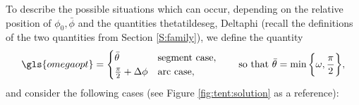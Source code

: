 \documentclass[reqno]{amsart}
\theoremstyle{definition} \newtheorem{definition}{Definition}[section]
\theoremstyle{definition} \newtheorem{remark}[definition]{Remark}
\theoremstyle{plain} \newtheorem{lemma}[definition]{Lemma}
\theoremstyle{plain} \newtheorem{proposition}[definition]{Proposition}
\theoremstyle{plain} \newtheorem{theorem}[definition]{Theorem}
\theoremstyle{plain} \newtheorem{corollary}[definition]{Corollary}
\theoremstyle{definition} \newtheorem{example}[definition]{Example}
\theoremstyle{plain} \newtheorem{claim}[clai]{Claim}
\theoremstyle{definition} \newtheorem{assumption}[definition]{Assumption}
\theoremstyle{definition} \newtheorem{observation}[definition]{Observation}
\newcommand{\1}{\mathbbm 1}
\numberwithin{equation}{section} %
\theoremstyle{plain} \newtheorem*{theorem*}{Theorem}
\theoremstyle{plain} \newtheorem{mthm}[maintheorem]{Main Theorem}
\theoremstyle{plain} \newtheorem*{mthm*}{Main Theorem}
\theoremstyle{plain} \newtheorem*{conjecture*}{Conjecture}
\theoremstyle{plain} \newtheorem{conjecture}[definition]{Conjecture}
\theoremstyle{plain} \newtheorem*{problem*}{Problem}
\begin{document}
To describe the possible situations which can occur, depending on the relative position of $\phi_0, \bar \phi$ and the quantities \gls{thetatildeseg}, \gls{Deltaphi} (recall the definitions of the two quantities from Section \ref{S:family}), we define the quantity 
\begin{equation}
\label{Eq:def:omega:bar:theta}
\gls{omegaopt} = \begin{cases}
\bar \theta & \text{segment case}, \\
\frac{\pi}{2} + \Delta \phi & \text{arc case},
\end{cases} \qquad \text{so that} \ \bar \theta = \min \bigg\{ \omega, \frac{\pi}{2} \bigg\},
\end{equation}
and consider the following cases (see Figure \ref{fig:tent:solution} as a reference):
\end{document}
